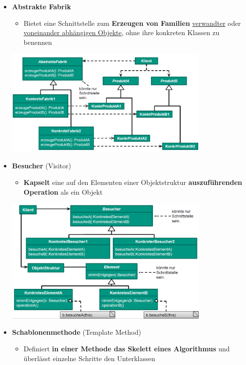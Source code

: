 \begin{itemize}
\item \textbf{Abstrakte Fabrik}
\begin{itemize}
\item Bietet eine Schnittstelle zum \textbf{Erzeugen von Familien} \underline{verwandter} oder \newline \underline{voneinander abhängigen Objekte}, ohne ihre konkreten Klassen zu benennen
\end{itemize}
\begin{center}
\includegraphics[width=0.8\textwidth]{../images/abstrakteFabrik.png}
\end{center}
\item \textbf{Besucher} (Visitor)
\begin{itemize}
\item \textbf{Kapselt} eine auf den Elementen einer Objektstruktur \textbf{auszuführenden Operation} als ein Objekt
\end{itemize}
\begin{center}
\includegraphics[width=0.8\textwidth]{../images/besucher.png}
\end{center}
\item \textbf{Schablonenmethode} (Template Method)
\begin{itemize}
\item Definiert \textbf{in einer Methode das Skelett eines Algorithmus} und überlässt einzelne Schritte den Unterklassen

\end{itemize}
\end{itemize}
